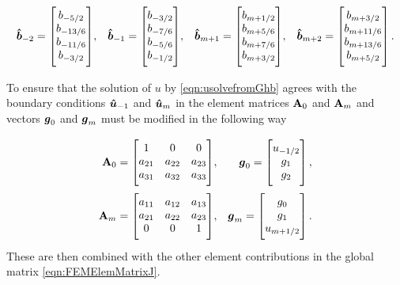 \begin{align*}
\vecn{\hat{b}}_{-2} = \begin{bmatrix} \TM
b_{-5/2} \\ b_{-13/6} \\ b_{-11/6} \\ b_{-3/2} \BM\end{bmatrix}&, &\vecn{\hat{b}}_{-1} = \begin{bmatrix} \TM
b_{-3/2} \\ b_{-7/6} \\ b_{-5/6} \\ b_{-1/2} \BM\end{bmatrix}&, &\vecn{\hat{b}}_{m+1} = \begin{bmatrix} \TM
b_{m+1/2} \\ b_{m+5/6} \\ b_{m+7/6} \\ b_{m+3/2} \BM\end{bmatrix}&, &\vecn{\hat{b}}_{m+2} = \begin{bmatrix} \TM
b_{m+3/2} \\ b_{m+11/6} \\ b_{m+13/6} \\ b_{m+5/2} \BM\end{bmatrix}.
\end{align*}

To ensure that the solution of $u$ by \eqref{eqn:usolvefromGhb} agrees with the boundary conditions $\boldsymbol{\hat{u}}_{-1}$ and $\boldsymbol{\hat{u}}_{m}$ in the element matrices $\mathbf{A}_0$ and $\mathbf{A}_m$ and vectors $\boldsymbol{g}_0$ and $\boldsymbol{g}_m$ must be modified in the following way 

\begin{align}
\matr{A}_{0} = 
\begin{bmatrix}
\TM 1 &0 &0 \\
a_{21} & a_{22} & a_{23} \\
a_{31} & a_{32} & a_{33} \BM
\end{bmatrix} &,& \vecn{g}_{0} = \begin{bmatrix}
\TM u_{-1/2} \\
g_1 \\
g_2 \BM
\end{bmatrix},\\
\matr{A}_{m} = 
\begin{bmatrix}
\TM a_{11} & a_{12} & a_{13} \\
a_{21} & a_{22} & a_{23} \\
0 & 0 & 1 \BM
\end{bmatrix} &,& \vecn{g}_{m} = \begin{bmatrix}
\TM g_0\\ 
g_1 \\
u_{m+1/2} \BM
\end{bmatrix}.
\end{align}
These are then combined with the other element contributions in the global matrix \eqref{eqn:FEMElemMatrixJ}.

